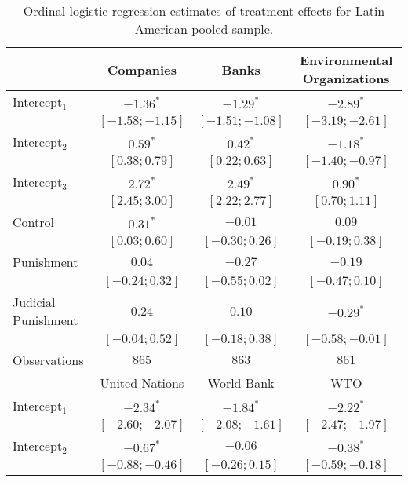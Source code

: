 \begin{table}[h]
\begin{center}
\caption{Ordinal logistic regression estimates of treatment effects for Latin American pooled sample.}
\begin{threeparttable}
\begin{tabular}{l c c c}
\hline
 & Companies & Banks & Environmental
Organizations \\
\hline
Intercept$_1$       & $-1.36^{*}$       & $-1.29^{*}$       & $-2.89^{*}$       \\
                    & $ [-1.58; -1.15]$ & $ [-1.51; -1.08]$ & $ [-3.19; -2.61]$ \\
Intercept$_2$       & $0.59^{*}$        & $0.42^{*}$        & $-1.18^{*}$       \\
                    & $ [ 0.38;  0.79]$ & $ [ 0.22;  0.63]$ & $ [-1.40; -0.97]$ \\
Intercept$_3$       & $2.72^{*}$        & $2.49^{*}$        & $0.90^{*}$        \\
                    & $ [ 2.45;  3.00]$ & $ [ 2.22;  2.77]$ & $ [ 0.70;  1.11]$ \\
Control             & $0.31^{*}$        & $-0.01$           & $0.09$            \\
                    & $ [ 0.03;  0.60]$ & $ [-0.30;  0.26]$ & $ [-0.19;  0.38]$ \\
Punishment          & $0.04$            & $-0.27$           & $-0.19$           \\
                    & $ [-0.24;  0.32]$ & $ [-0.55;  0.02]$ & $ [-0.47;  0.10]$ \\
Judicial Punishment & $0.24$            & $0.10$            & $-0.29^{*}$       \\
                    & $ [-0.04;  0.52]$ & $ [-0.18;  0.38]$ & $ [-0.58; -0.01]$ \\
\hline
Observations        & $865$             & $863$             & $861$             \\
\hline
 & United Nations & World Bank & WTO \\
\hline
Intercept$_1$       & $-2.34^{*}$       & $-1.84^{*}$       & $-2.22^{*}$       \\
                    & $ [-2.60; -2.07]$ & $ [-2.08; -1.61]$ & $ [-2.47; -1.97]$ \\
Intercept$_2$       & $-0.67^{*}$       & $-0.06$           & $-0.38^{*}$       \\
                    & $ [-0.88; -0.46]$ & $ [-0.26;  0.15]$ & $ [-0.59; -0.18]$ \\

\end{tabular}
\end{threeparttable}
\end{center}
\end{table}
